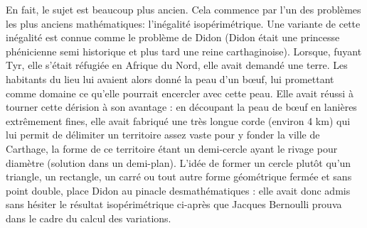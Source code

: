 \documentclass[10pt,a4paper]{article}%
\theoremstyle{theorem}
\theoremstyle{definition}
\begin{document}
	En fait, le sujet est beaucoup plus ancien. Cela commence par l'un des problèmes les plus anciens mathématiques: l'inégalité isopérimétrique. Une variante de cette inégalité est connue comme le problème de Didon (Didon était une princesse phénicienne semi historique et plus tard une reine carthaginoise). Lorsque, fuyant Tyr, elle s’était réfugiée en Afrique du Nord, elle avait demandé une terre. Les habitants du lieu lui avaient alors donné la peau d’un bœuf, lui promettant comme domaine ce qu’elle pourrait encercler avec cette peau. Elle avait réussi à tourner cette dérision à son avantage : en découpant la peau de bœuf en lanières extrêmement fines, elle avait fabriqué une très longue corde (environ 4 km) qui lui permit de délimiter un territoire assez vaste pour y fonder la ville de Carthage, la forme de ce territoire étant un demi-cercle ayant le rivage pour diamètre (solution dans un demi-plan).
	L'idée de former un cercle plutôt qu'un triangle, un rectangle, un carré ou tout autre forme géométrique fermée et sans point double, place Didon au pinacle desmathématiques : elle avait donc admis sans hésiter le résultat isopérimétrique ci-après que Jacques Bernoulli prouva dans le cadre du calcul des variations.
	
	
	
%	
	
	
%	
	
\end{document}
